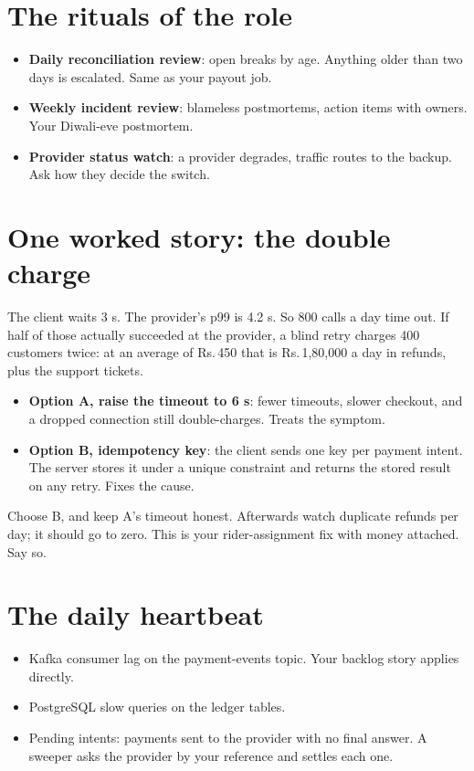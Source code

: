 \documentclass[10pt,a4paper]{article}
\begin{document}
\section{The rituals of the role}
\begin{itemize}
  \item \textbf{Daily reconciliation review}: open breaks by age. Anything older than two days is escalated. \K Same as your payout job.
  \item \textbf{Weekly incident review}: blameless postmortems, action items with owners. \K Your Diwali-eve postmortem.
  \item \textbf{Provider status watch}: a provider degrades, traffic routes to the backup. \LRN Ask how they decide the switch.
\end{itemize}

\section{One worked story: the double charge}
The client waits 3 s. The provider's p99 is 4.2 s. So 800 calls a day time out. If half of those actually succeeded at the provider, a blind retry charges 400 customers twice: at an average of Rs.\,450 that is Rs.\,1,80,000 a day in refunds, plus the support tickets.
\begin{itemize}
  \item \textbf{Option A, raise the timeout to 6 s}: fewer timeouts, slower checkout, and a dropped connection still double-charges. Treats the symptom.
  \item \textbf{Option B, idempotency key}: the client sends one key per payment intent. The server stores it under a unique constraint and returns the stored result on any retry. Fixes the cause.
\end{itemize}
Choose B, and keep A's timeout honest. Afterwards watch duplicate refunds per day; it should go to zero. \K This is your rider-assignment fix with money attached. Say so.

\section{The daily heartbeat}
\begin{itemize}
  \item \K Kafka consumer lag on the payment-events topic. Your backlog story applies directly.
  \item \K PostgreSQL slow queries on the ledger tables.
  \item \LRN Pending intents: payments sent to the provider with no final answer. A sweeper asks the provider by your reference and settles each one.
\end{itemize}
\end{document}
